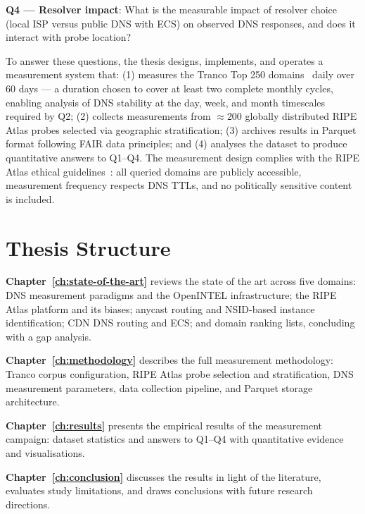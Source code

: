 \textbf{Q4 — Resolver impact}: What is the measurable impact of resolver choice (local \ac{ISP} versus public \ac{DNS} with \ac{ECS}) on observed \ac{DNS} responses, and does it interact with probe location?

To answer these questions, the thesis designs, implements, and operates a measurement system that: (1) measures the Tranco Top 250 domains~\cite{LePochat2019} daily over 60 days — a duration chosen to cover at least two complete monthly cycles, enabling analysis of \ac{DNS} stability at the day, week, and month timescales required by Q2; (2) collects measurements from $\approx$200 globally distributed RIPE Atlas probes selected via geographic stratification; (3) archives results in Parquet format following \ac{FAIR} data principles; and (4) analyses the dataset to produce quantitative answers to Q1–Q4. The measurement design complies with the RIPE Atlas ethical guidelines~\cite{Kisteleki2016}: all queried domains are publicly accessible, measurement frequency respects \ac{DNS} \ac{TTL}s, and no politically sensitive content is included.

\bigskip
\section{Thesis Structure}
\label{sec:1.4}

\textbf{Chapter~\ref{ch:state-of-the-art}} reviews the state of the art across five domains: \ac{DNS} measurement paradigms and the OpenINTEL infrastructure; the RIPE Atlas platform and its biases; anycast routing and \ac{NSID}-based instance identification; \ac{CDN} \ac{DNS} routing and \ac{ECS}; and domain ranking lists, concluding with a gap analysis.

\textbf{Chapter~\ref{ch:methodology}} describes the full measurement methodology: Tranco corpus configuration, RIPE Atlas probe selection and stratification, \ac{DNS} measurement parameters, data collection pipeline, and Parquet storage architecture.

\textbf{Chapter~\ref{ch:results}} presents the empirical results of the measurement campaign: dataset statistics and answers
to Q1–Q4 with quantitative evidence and visualisations.

\textbf{Chapter~\ref{ch:conclusion}} discusses the results in light of the literature, evaluates study limitations, and draws
conclusions with future research directions.